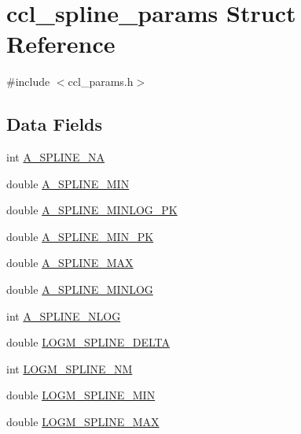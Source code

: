 \hypertarget{structccl__spline__params}{}\section{ccl\+\_\+spline\+\_\+params Struct Reference}
\label{structccl__spline__params}


{\ttfamily \#include $<$ccl\+\_\+params.\+h$>$}

\subsection*{Data Fields}
\begin{DoxyCompactItemize}
\item 
int \mbox{\hyperlink{structccl__spline__params_a5206373ecbc1c9cc7fbce0840dc83e38}{A\+\_\+\+S\+P\+L\+I\+N\+E\+\_\+\+NA}}
\item 
double \mbox{\hyperlink{structccl__spline__params_a43f7b575552fac8d54fd75bd60e42cc7}{A\+\_\+\+S\+P\+L\+I\+N\+E\+\_\+\+M\+IN}}
\item 
double \mbox{\hyperlink{structccl__spline__params_a58ef2cbecc4a7d3100182fd07c90fcf7}{A\+\_\+\+S\+P\+L\+I\+N\+E\+\_\+\+M\+I\+N\+L\+O\+G\+\_\+\+PK}}
\item 
double \mbox{\hyperlink{structccl__spline__params_a800c10517429ab9b35ffccf3bff5f1f0}{A\+\_\+\+S\+P\+L\+I\+N\+E\+\_\+\+M\+I\+N\+\_\+\+PK}}
\item 
double \mbox{\hyperlink{structccl__spline__params_aa227bbd087fee06f845b9de60ff09556}{A\+\_\+\+S\+P\+L\+I\+N\+E\+\_\+\+M\+AX}}
\item 
double \mbox{\hyperlink{structccl__spline__params_ad8e5259b94af0abb124baa51bde42d68}{A\+\_\+\+S\+P\+L\+I\+N\+E\+\_\+\+M\+I\+N\+L\+OG}}
\item 
int \mbox{\hyperlink{structccl__spline__params_a53ec49c7af23118fae9868df9569ff72}{A\+\_\+\+S\+P\+L\+I\+N\+E\+\_\+\+N\+L\+OG}}
\item 
double \mbox{\hyperlink{structccl__spline__params_a9c3639db1ee0c3f352886b0d2cfe7b74}{L\+O\+G\+M\+\_\+\+S\+P\+L\+I\+N\+E\+\_\+\+D\+E\+L\+TA}}
\item 
int \mbox{\hyperlink{structccl__spline__params_a2208a54444d524ccb5fd9de56f548078}{L\+O\+G\+M\+\_\+\+S\+P\+L\+I\+N\+E\+\_\+\+NM}}
\item 
double \mbox{\hyperlink{structccl__spline__params_a8f5efa2b6b537e4bb668d91c93363c0f}{L\+O\+G\+M\+\_\+\+S\+P\+L\+I\+N\+E\+\_\+\+M\+IN}}
\item 
double \mbox{\hyperlink{structccl__spline__params_a26242a0b357c4ccbd5f01b9c5044334a}{L\+O\+G\+M\+\_\+\+S\+P\+L\+I\+N\+E\+\_\+\+M\+AX}}

\end{DoxyCompactItemize}
